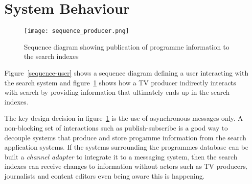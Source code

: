 \documentclass[a4paper]{report}
\begin{document}
\section{System Behaviour}

\begin{comment}
@startuml sequence_producer.png

skinparam monochrome true

actor Producer
participant "Programmes Database" as prog
participant "Search Index Service" as service
participant "Search Indexes" as indexes

Producer ->> prog

activate prog
prog ->> service
deactivate prog

activate service
service ->> indexes
deactivate service

activate indexes
indexes -> indexes : reindex
deactivate indexes

@enduml
\end{comment}
\begin{figure}[t]
  \begin{center}
    \texttt{[image: sequence\_producer.png]}
  \end{center}
  \caption{Sequence diagram showing publication of programme information to the search indexes\label{sequence-producer}}
\end{figure}

Figure~\ref{sequence-user} shows a sequence diagram defining a user
interacting with the search system and figure~\ref{sequence-producer}
shows how a TV producer indirectly interacts with search by providing
information that ultimately ends up in the search indexes.

The key design decision in figure~\ref{sequence-producer} is the use of
asynchronous messages only. A non-blocking set of interactions such as
publish-subscribe \cite{hohpe2004enterprise} is a good way to decouple
systems that produce and store progamme information from the search
application systems. If the systems surrounding the programmes database
can be built a \emph{channel adapter} \cite{hohpe2004enterprise} to integrate
it to a messaging system, then the search indexes can receive changes to
information without actors such as TV producers, journalists and content
editors even being aware this is happening.
\end{document}
